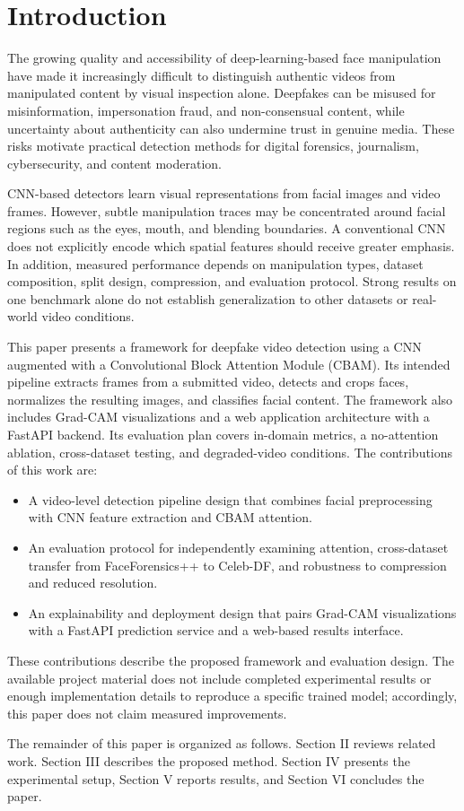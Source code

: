 \section{Introduction}

The growing quality and accessibility of deep-learning-based face manipulation have made it increasingly difficult to distinguish authentic videos from manipulated content by visual inspection alone. Deepfakes can be misused for misinformation, impersonation fraud, and non-consensual content, while uncertainty about authenticity can also undermine trust in genuine media. These risks motivate practical detection methods for digital forensics, journalism, cybersecurity, and content moderation.

CNN-based detectors learn visual representations from facial images and video frames. However, subtle manipulation traces may be concentrated around facial regions such as the eyes, mouth, and blending boundaries. A conventional CNN does not explicitly encode which spatial features should receive greater emphasis. In addition, measured performance depends on manipulation types, dataset composition, split design, compression, and evaluation protocol. Strong results on one benchmark alone do not establish generalization to other datasets or real-world video conditions.

This paper presents a framework for deepfake video detection using a CNN augmented with a Convolutional Block Attention Module (CBAM). Its intended pipeline extracts frames from a submitted video, detects and crops faces, normalizes the resulting images, and classifies facial content. The framework also includes Grad-CAM visualizations and a web application architecture with a FastAPI backend. Its evaluation plan covers in-domain metrics, a no-attention ablation, cross-dataset testing, and degraded-video conditions. The contributions of this work are:
\begin{itemize}
    \item A video-level detection pipeline design that combines facial preprocessing with CNN feature extraction and CBAM attention.
    \item An evaluation protocol for independently examining attention, cross-dataset transfer from FaceForensics++ to Celeb-DF, and robustness to compression and reduced resolution.
    \item An explainability and deployment design that pairs Grad-CAM visualizations with a FastAPI prediction service and a web-based results interface.
\end{itemize}
These contributions describe the proposed framework and evaluation design. The available project material does not include completed experimental results or enough implementation details to reproduce a specific trained model; accordingly, this paper does not claim measured improvements.

The remainder of this paper is organized as follows. Section II reviews related work. Section III describes the proposed method. Section IV presents the experimental setup, Section V reports results, and Section VI concludes the paper.
